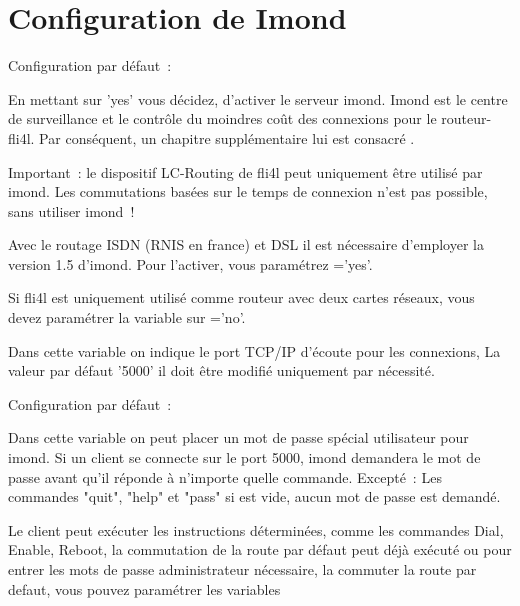 
  \section{Configuration de Imond}

  \begin{description}

    Configuration par défaut~: 

    {En mettant  sur 'yes' vous décidez, d'activer
    le serveur imond. Imond est le centre de surveillance et le contrôle du
    moindres coût des connexions pour le routeur-fli4l. Par conséquent, un
    chapitre supplémentaire lui est consacré .

      Important~: le dispositif LC-Routing de fli4l peut uniquement
      être utilisé par imond. Les commutations basées sur le temps de
      connexion n'est pas possible, sans utiliser imond~!

      Avec le routage ISDN (RNIS en france) et DSL il est nécessaire
      d'employer la version 1.5 d'imond. Pour l'activer, vous paramétrez
      ='yes'.

      Si fli4l est uniquement utilisé comme routeur avec deux cartes réseaux,
      vous devez paramétrer la variable sur ='no'.}


    {Dans cette variable on indique le port TCP/IP d'écoute pour les
    connexions, La valeur par défaut '5000' il doit être modifié uniquement
    par nécessité.}


      Configuration par défaut~: 

    {Dans cette variable on peut placer un mot de passe spécial utilisateur
    pour imond. Si un client se connecte sur le port 5000, imond demandera
    le mot de passe avant qu'il réponde à n'importe quelle commande.
    Excepté~: Les commandes "quit", "help" et "pass" si 
    est vide, aucun mot de passe est demandé.

      Le client peut exécuter les instructions déterminées, comme les commandes
      Dial, Enable, Reboot, la commutation de la route par défaut peut déjà
      exécuté ou pour entrer les mots de passe administrateur nécessaire,
      la commuter la route par defaut, vous pouvez paramétrer les variables

}
\end{description}
